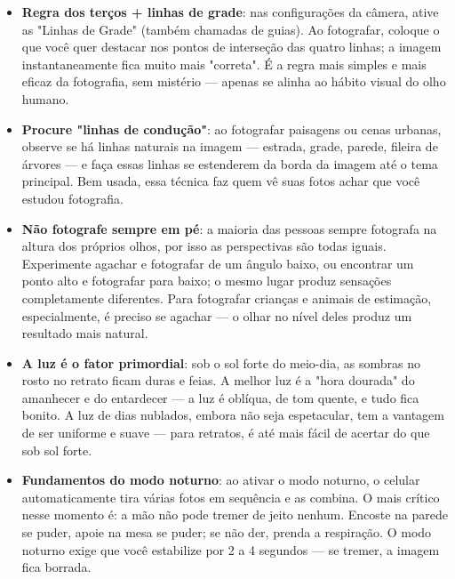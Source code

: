 \begin{itemize}
  \item \textbf{Regra dos terços + linhas de grade}: nas configurações da câmera, ative as "Linhas de Grade" (também chamadas de guias). Ao fotografar, coloque o que você quer destacar nos pontos de interseção das quatro linhas; a imagem instantaneamente fica muito mais "correta". É a regra mais simples e mais eficaz da fotografia, sem mistério — apenas se alinha ao hábito visual do olho humano.
  \item \textbf{Procure "linhas de condução"}: ao fotografar paisagens ou cenas urbanas, observe se há linhas naturais na imagem — estrada, grade, parede, fileira de árvores — e faça essas linhas se estenderem da borda da imagem até o tema principal. Bem usada, essa técnica faz quem vê suas fotos achar que você estudou fotografia.
  \item \textbf{Não fotografe sempre em pé}: a maioria das pessoas sempre fotografa na altura dos próprios olhos, por isso as perspectivas são todas iguais. Experimente agachar e fotografar de um ângulo baixo, ou encontrar um ponto alto e fotografar para baixo; o mesmo lugar produz sensações completamente diferentes. Para fotografar crianças e animais de estimação, especialmente, é preciso se agachar — o olhar no nível deles produz um resultado mais natural.
  \item \textbf{A luz é o fator primordial}: sob o sol forte do meio-dia, as sombras no rosto no retrato ficam duras e feias. A melhor luz é a "hora dourada" do amanhecer e do entardecer — a luz é oblíqua, de tom quente, e tudo fica bonito. A luz de dias nublados, embora não seja espetacular, tem a vantagem de ser uniforme e suave — para retratos, é até mais fácil de acertar do que sob sol forte.
  \item \textbf{Fundamentos do modo noturno}: ao ativar o modo noturno, o celular automaticamente tira várias fotos em sequência e as combina. O mais crítico nesse momento é: a mão não pode tremer de jeito nenhum. Encoste na parede se puder, apoie na mesa se puder; se não der, prenda a respiração. O modo noturno exige que você estabilize por 2 a 4 segundos — se tremer, a imagem fica borrada.
\end{itemize}


